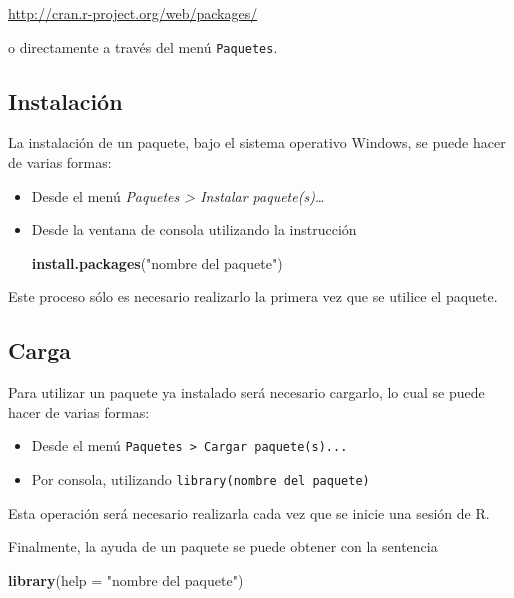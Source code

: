 \documentclass[]{book}
\newenvironment{Shaded}{\begin{snugshade}}{\end{snugshade}}
\newcommand{\KeywordTok}[1]{\textcolor[rgb]{0.13,0.29,0.53}{\textbf{#1}}}
\newcommand{\DataTypeTok}[1]{\textcolor[rgb]{0.13,0.29,0.53}{#1}}
\newcommand{\StringTok}[1]{\textcolor[rgb]{0.31,0.60,0.02}{#1}}
\newcommand{\NormalTok}[1]{#1}
\begin{document}
\url{http://cran.r-project.org/web/packages/}

o directamente a través del menú \texttt{Paquetes}.

\subsection{Instalación}\label{instalacion-pkg}

La instalación de un paquete, bajo el sistema operativo Windows, se
puede hacer de varias formas:

\begin{itemize}
\item
  Desde el menú \emph{Paquetes \textgreater{} Instalar
  paquete(s)\ldots{}}
\item
  Desde la ventana de consola utilizando la instrucción

\begin{Shaded}
\begin{Highlighting}[]
\KeywordTok{install.packages}\NormalTok{(}\StringTok{"nombre del paquete"}\NormalTok{)}
\end{Highlighting}
\end{Shaded}
\end{itemize}

Este proceso sólo es necesario realizarlo la primera vez que se utilice
el paquete.

\subsection{Carga}\label{carga}

Para utilizar un paquete ya instalado será necesario cargarlo, lo cual
se puede hacer de varias formas:

\begin{itemize}
\item
  Desde el menú \texttt{Paquetes\ \textgreater{}\ Cargar\ paquete(s)...}
\item
  Por consola, utilizando \texttt{library(nombre\ del\ paquete)}
\end{itemize}

Esta operación será necesario realizarla cada vez que se inicie una
sesión de R.

Finalmente, la ayuda de un paquete se puede obtener con la sentencia

\begin{Shaded}
\begin{Highlighting}[]
\KeywordTok{library}\NormalTok{(}\DataTypeTok{help =} \StringTok{"nombre del paquete"}\NormalTok{) }
\end{Highlighting}
\end{Shaded}
\end{document}
